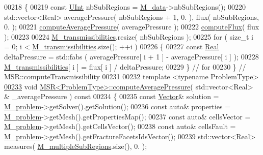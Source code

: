\begin{DoxyCode}
00218 \{
00219     \textcolor{keyword}{const} \hyperlink{namespaceFVCode3D_a4bf7e328c75d0fd504050d040ebe9eda}{UInt} nbSubRegions = \hyperlink{classFVCode3D_1_1MSR_a03e013e5191655455e66563e815f262b}{M\_data}->nbSubRegions();
00220     std::vector<Real> averagePressure( nbSubRegions + 1, 0. ), flux( nbSubRegions, 0. );
00221     \hyperlink{classFVCode3D_1_1MSR_a6425feaf241a89b4be13bab2e83c8b2e}{computeAveragePressure}( averagePressure );
00222     \hyperlink{classFVCode3D_1_1MSR_ae29570a0d0d6767454ebf70f97e22f47}{computeFlux}( flux );
00223 
00224     \hyperlink{classFVCode3D_1_1MSR_abcb3d099c26d9747b02231cb0d3b7bb3}{M\_transmissibilities}.resize( nbSubRegions );
00225     \textcolor{keywordflow}{for} ( \textcolor{keywordtype}{size\_t} i = 0; i < \hyperlink{classFVCode3D_1_1MSR_abcb3d099c26d9747b02231cb0d3b7bb3}{M\_transmissibilities}.size(); ++i )
00226     \{
00227         \textcolor{keyword}{const} \hyperlink{namespaceFVCode3D_a40c1f5588a248569d80aa5f867080e83}{Real} deltaPressure = std::fabs ( averagePressure[ i + 1 ] - averagePressure[ i ] );
00228         \hyperlink{classFVCode3D_1_1MSR_abcb3d099c26d9747b02231cb0d3b7bb3}{M\_transmissibilities}[ i ] = flux[ i ] / deltaPressure;
00229     \} \textcolor{comment}{// for}
00230 \} \textcolor{comment}{// MSR::computeTransmissibility}
00231 
00232 \textcolor{keyword}{template} <\textcolor{keyword}{typename} ProblemType>
\hypertarget{MultipleSubRegions_8hpp_source.tex_l00233}{}\hyperlink{classFVCode3D_1_1MSR_a6425feaf241a89b4be13bab2e83c8b2e}{00233} \textcolor{keywordtype}{void} \hyperlink{classFVCode3D_1_1MSR_a6425feaf241a89b4be13bab2e83c8b2e}{MSR<ProblemType>::computeAveragePressure}( std::vector<Real> & 
      \_averagePressure )\textcolor{keyword}{ const}
00234 \textcolor{keyword}{}\{
00235     \textcolor{keyword}{const} \hyperlink{namespaceFVCode3D_a16ccf345652402bccd1a5d2e6782526c}{Vector}& solution = \hyperlink{classFVCode3D_1_1MSR_a531760a5415f63b7be6087ab117031e5}{M\_problem}->getSolver().getSolution();
00236     \textcolor{keyword}{const} \textcolor{keyword}{auto}& properties = \hyperlink{classFVCode3D_1_1MSR_a531760a5415f63b7be6087ab117031e5}{M\_problem}->getMesh().getPropertiesMap();
00237     \textcolor{keyword}{const} \textcolor{keyword}{auto}& cellsVector = \hyperlink{classFVCode3D_1_1MSR_a531760a5415f63b7be6087ab117031e5}{M\_problem}->getMesh().getCellsVector();
00238     \textcolor{keyword}{const} \textcolor{keyword}{auto}& cellsFault = \hyperlink{classFVCode3D_1_1MSR_a531760a5415f63b7be6087ab117031e5}{M\_problem}->getMesh().getFractureFacetsIdsVector();
00239     std::vector<Real> measures( \hyperlink{classFVCode3D_1_1MSR_a38cba0138e4ebd055d47b3d9d9d32623}{M\_multipleSubRegions}.size(), 0. );

\end{DoxyCode}
